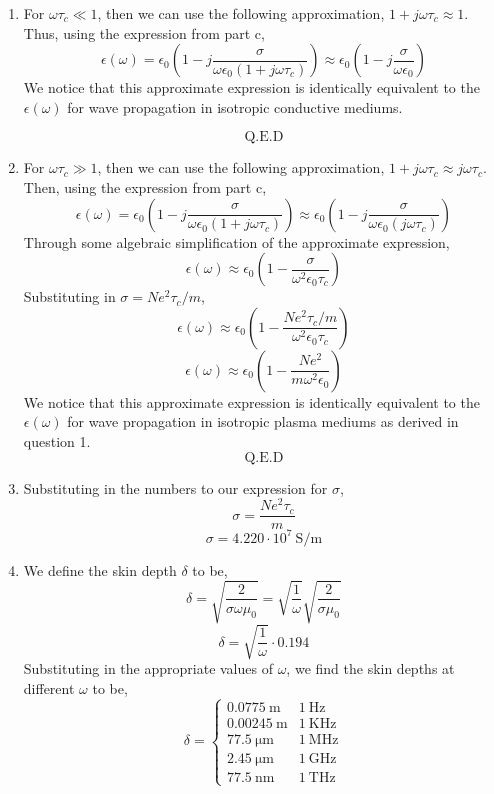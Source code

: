 \documentclass[12pt]{article}
\begin{document}
\begin{enumerate}
\begin{enumerate}
		\item [d.]
		For $\omega\tau_c \ll 1$, then we can use the following approximation, $1+j\omega \tau_c\approx 1$.
		Thus, using the expression from part c,
		\[\epsilon(\omega)=\epsilon_0\left(1-j\frac{\sigma}{\omega\epsilon_0(1+j\omega\tau_c)}\right)\approx \epsilon_0\left(1-j\frac{\sigma}{\omega\epsilon_0}\right)\]
		We notice that this approximate expression is identically equivalent to the $\epsilon(\omega)$ for wave propagation in isotropic conductive mediums.

		\[\boxed{\text{Q.E.D}}\]

		\item [e.]
		For $\omega\tau_c \gg 1$, then we can use the following approximation, $1+j\omega \tau_c \approx j\omega \tau_c$.
		Then, using the expression from part c,
		\[\epsilon(\omega)=\epsilon_0\left(1-j\frac{\sigma}{\omega\epsilon_0(1+j\omega\tau_c)}\right)\approx \epsilon_0\left(1-j\frac{\sigma}{\omega\epsilon_0(j\omega\tau_c)}\right)\]
		Through some algebraic simplification of the approximate expression,
		\[\epsilon(\omega)\approx \epsilon_0\left(1-\frac{\sigma}{\omega^2\epsilon_0\tau_c}\right)\]
		Substituting in $\sigma=Ne^2\tau_c/m$,
		\[\epsilon(\omega)\approx \epsilon_0\left(1-\frac{Ne^2\tau_c/m}{\omega^2\epsilon_0\tau_c}\right)\]
		\[\epsilon(\omega)\approx \epsilon_0\left(1-\frac{Ne^2}{m\omega^2\epsilon_0}\right)\]
		We notice that this approximate expression is identically equivalent to the $\epsilon(\omega)$ for wave propagation in isotropic plasma mediums as derived in question 1.
		\[\boxed{\text{Q.E.D}}\]

		\item [f.]
		Substituting in the numbers to our expression for $\sigma$,
		\[\sigma=\frac{Ne^2\tau_c}{m}\]
		\[\boxed{\sigma=4.220 \cdot 10^7 \: \mathrm{S/m}}\]
		
		\item [g.]
		We define the skin depth $\delta$ to be,
		\[\delta = \sqrt{\frac{2}{\sigma \omega \mu_0}}=\sqrt{\frac{1}{\omega}}\sqrt{\frac{2}{\sigma \mu_0}}\]
		\[\delta = \sqrt{\frac{1}{\omega}}\cdot 0.194\]
		Substituting in the appropriate values of $\omega$, we find the skin depths at different $\omega$ to be,
		\[\boxed{\delta=\begin{cases}
			0.0775 \: \mathrm{m} & 1 \: \mathrm{Hz} \\ 
			0.00245 \: \mathrm{m} & 1\: \mathrm{KHz} \\ 
			77.5 \: \mathrm{\mu m} & 1\:\mathrm{MHz} \\ 
			2.45 \: \mathrm{\mu m} & 1\:\mathrm{GHz} \\ 
			77.5 \: \mathrm{nm} & 1\: \mathrm{THz}
		\end{cases}}\]


\end{enumerate}
\end{enumerate}
\end{document}
